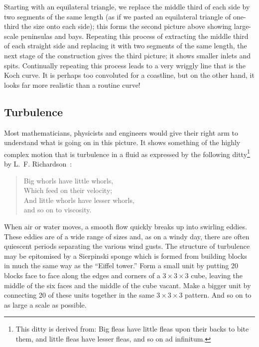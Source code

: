 \documentclass[12pt]{article}
\begin{document}
\newpage

Starting with an equilateral triangle, we replace the middle third of 
each side by two segments of the same length (as if we pasted an 
equilateral triangle of one-third the size onto each side); this 
forms the second picture above showing large-scale peninsulas and 
bays.  Repeating this process of extracting the middle third of each 
straight side and replacing it with two segments of the same length, 
the next stage of the construction gives the third picture; it shows 
smaller inlets and spits.  Continually repeating this process leads 
to a very wriggly line that is the Koch curve.  It is perhaps too 
convoluted for a coastline, but on the other hand, it looks far more 
realistic than a routine curve!

\newpage

\subsection{Turbulence}
\label{ssturb}

Most mathematicians, physicists and engineers would give their right 
arm to understand what is going on in this picture.  It shows 
something of the highly complex motion that is turbulence in a fluid 
as expressed by the following ditty\footnote{This ditty is derived 
from: Big fleas have little fleas upon their backs to bite them, and 
little fleas have lesser fleas, and so on ad infinitum.} by 
L.~F. Richardson~\cite{Rich}:
\begin{verse}
	Big whorls have little whorls,\\
	Which feed on their velocity;\\
	And little whorls have lesser whorls,\\
	and so on to viscosity.
\end{verse}


When air or water moves, a smooth flow quickly breaks up into 
swirling eddies.  These eddies are of a wide range of sizes and, as 
on a windy day, there are often quiescent periods separating the 
various wind gusts.  The structure of turbulence may be epitomised by 
a Sierpinski sponge which is formed from building blocks in much the 
same way as the ``Eiffel tower.''  Form a small unit by putting 20 
blocks face to face along the edges and corners of a $3\times 
3\times 3$ cube, 
leaving the middle of the six faces and the middle of the cube 
vacant.  Make a bigger unit by connecting 20 of these units together 
in the same 
\(
	3\times 3\times 3
\)
 pattern.  And so on to as large a scale as possible.
 
\end{document}
